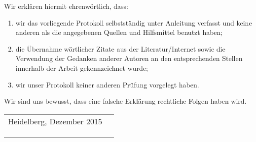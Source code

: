 \documentclass[
final,
twoside,
paper=a4, paper=portrait, pagesize=auto, 
fontsize=12pt,  
]{scrartcl}
\begin{document}
	\begin{minipage}{\linewidth}
		\vspace*{2cm}
		Wir erklären hiermit ehrenwörtlich, dass: \\
		\begin{enumerate}
			\item wir das vorliegende Protokoll selbstständig unter Anleitung verfasst und keine anderen als die angegebenen Quellen und Hilfsmittel benutzt haben;
			\item die Übernahme wörtlicher Zitate aus der Literatur/Internet sowie die Verwendung der Gedanken anderer Autoren an den entsprechenden Stellen innerhalb der Arbeit gekennzeichnet wurde; 
			\item wir unser Protokoll keiner anderen Prüfung vorgelegt haben. \\
		\end{enumerate}
		Wir sind uns bewusst, dass eine falsche Erklärung rechtliche Folgen haben wird.
	\end{minipage}
	\begin{minipage}{\linewidth}\vspace*{1cm}
		\begin{tabular}{p{20em}p{50em}}
			Heidelberg, Dezember 2015 & \\
			\\
			\\
			\\
		\end{tabular}
	\end{minipage}
	\clearpage
	
	\newpage
	\thispagestyle{empty}
	\tableofcontents
	
    \newpage
	
	\renewcommand\refname{References}
	{}
	
\end{document}
